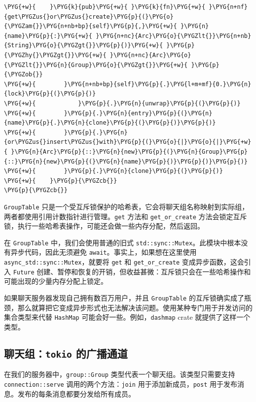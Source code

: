 \begin{Verbatim}[commandchars=\\\{\},breaklines=true,breakanywhere=true,fontsize=\codefont,xleftmargin=17bp]
\PYG{+w}{    }\PYG{k}{pub}\PYG{+w}{ }\PYG{k}{fn}\PYG{+w}{ }\PYG{n+nf}{get\PYGZus{}or\PYGZus{}create}\PYG{p}{(}\PYG{o}{\PYGZam{}}\PYG{n+nb+bp}{self}\PYG{p}{,}\PYG{+w}{ }\PYG{n}{name}\PYG{p}{:}\PYG{+w}{ }\PYG{n+nc}{Arc}\PYG{o}{\PYGZlt{}}\PYG{n+nb}{String}\PYG{o}{\PYGZgt{}}\PYG{p}{)}\PYG{+w}{ }\PYG{p}{\PYGZhy{}\PYGZgt{}}\PYG{+w}{ }\PYG{n+nc}{Arc}\PYG{o}{\PYGZlt{}}\PYG{n}{Group}\PYG{o}{\PYGZgt{}}\PYG{+w}{ }\PYG{p}{\PYGZob{}}
\PYG{+w}{        }\PYG{n+nb+bp}{self}\PYG{p}{.}\PYG{l+m+mf}{0.}\PYG{n}{lock}\PYG{p}{(}\PYG{p}{)}
\PYG{+w}{            }\PYG{p}{.}\PYG{n}{unwrap}\PYG{p}{(}\PYG{p}{)}
\PYG{+w}{        }\PYG{p}{.}\PYG{n}{entry}\PYG{p}{(}\PYG{n}{name}\PYG{p}{.}\PYG{n}{clone}\PYG{p}{(}\PYG{p}{)}\PYG{p}{)}
\PYG{+w}{        }\PYG{p}{.}\PYG{n}{or\PYGZus{}insert\PYGZus{}with}\PYG{p}{(}\PYG{o}{|}\PYG{o}{|}\PYG{+w}{ }\PYG{n}{Arc}\PYG{p}{::}\PYG{n}{new}\PYG{p}{(}\PYG{n}{Group}\PYG{p}{::}\PYG{n}{new}\PYG{p}{(}\PYG{n}{name}\PYG{p}{)}\PYG{p}{)}\PYG{p}{)}
\PYG{+w}{        }\PYG{p}{.}\PYG{n}{clone}\PYG{p}{(}\PYG{p}{)}
\PYG{+w}{    }\PYG{p}{\PYGZcb{}}
\PYG{p}{\PYGZcb{}}
\end{Verbatim}

\texttt{GroupTable} 只是一个受互斥锁保护的哈希表，它会将聊天组名称映射到实际组，两者都使用引用计数指针进行管理。\texttt{get} 方法和 \texttt{get\_or\_create} 方法会锁定互斥锁，执行一些哈希表操作，可能还会做一些内存分配，然后返回。

在 \texttt{GroupTable} 中，我们会使用普通的旧式 \texttt{std::sync::Mutex}。此模块中根本没有异步代码，因此无须避免 \texttt{await}。事实上，如果想在这里使用 \texttt{async\_std::sync::Mutex}，就要将 \texttt{get} 和 \texttt{get\_or\_create} 变成异步函数，这会引入 \texttt{Future} 创建、暂停和恢复的开销，但收益甚微：互斥锁只会在一些哈希操作和可能出现的少量内存分配上锁定。

如果聊天服务器发现自己拥有数百万用户，并且 \texttt{GroupTable} 的互斥锁确实成了瓶颈，那么就算把它变成异步形式也无法解决该问题。使用某种专门用于并发访问的集合类型来代替 \texttt{HashMap} 可能会好一些。例如，\texttt{dashmap} crate 就提供了这样一个类型。

\subsection{聊天组：\texttt{tokio} 的广播通道}

在我们的服务器中，\texttt{group::Group} 类型代表一个聊天组。该类型只需要支持 \texttt{connection::serve} 调用的两个方法：\texttt{join} 用于添加新成员，\texttt{post} 用于发布消息。发布的每条消息都要分发给所有成员。

